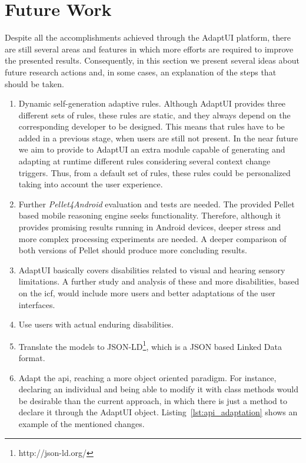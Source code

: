 \section{Future Work}
\label{sec:future_work}

Despite all the accomplishments achieved through the AdaptUI platform, there are 
still several areas and features in which more efforts are required to improve 
the presented results. Consequently, in this section we present several ideas 
about future research actions and, in some cases, an explanation of the steps 
that should be taken.

\begin{enumerate}[label=\alph*)]
  \item Dynamic self-generation adaptive rules. Although AdaptUI provides three 
  different sets of rules, these rules are static, and they always depend on 
  the corresponding developer to be designed. This means that rules have to 
  be added in a previous stage, when users are still not present. In the near 
  future we aim to provide to AdaptUI an extra module capable of generating and 
  adapting at runtime different rules considering several context change 
  triggers. Thus, from a default set of rules, these rules could be personalized 
  taking into account the user experience.
  
  \item Further \textit{Pellet4Android} evaluation and tests are needed. The
  provided Pellet based mobile reasoning engine seeks functionality. Therefore,
  although it provides promising results running in Android devices, deeper 
  stress and  more complex processing experiments are needed. A deeper
  comparison of both versions of Pellet should produce more concluding results.
  
  \item AdaptUI basically covers disabilities related to visual and hearing
  sensory limitations. A further study and analysis of these and more 
  disabilities, based on the \ac{icf}, would include more users and better 
  adaptations of the user interfaces.
  
  \item Use users with actual enduring disabilities.
  
  \item Translate the models to JSON-LD\footnote{http://json-ld.org/}, which is
  a JSON based Linked Data format.
  
  \item Adapt the \ac{api}, reaching a more object oriented paradigm. For instance,
  declaring an individual and being able to modify it with class methods would 
  be desirable than the current approach, in which there is just a method to
  declare it through the AdaptUI object. Listing~\ref{lst:api_adaptation} shows
  an example of the mentioned changes.
  

\end{enumerate}
